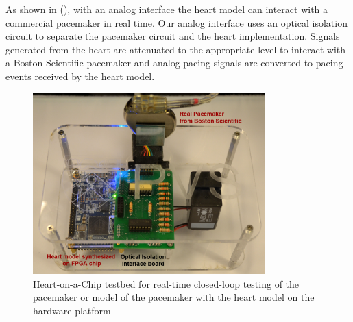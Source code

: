 As shown in (), with an analog interface the heart model can interact with a commercial pacemaker in real time. 
Our analog interface uses an optical isolation circuit to separate the pacemaker circuit and the heart implementation. 
Signals generated from the heart are attenuated to the appropriate level to interact with a Boston Scientific pacemaker and analog pacing signals are converted to pacing events received by the heart model. 

\begin{figure}[!b]
\center
		\includegraphics[width=0.8\textwidth]{figs/PVS.pdf}
\caption{Heart-on-a-Chip testbed for real-time closed-loop testing of the pacemaker or model of the pacemaker with the heart model on the hardware platform}
\label{fig:HOC}
\end{figure}





